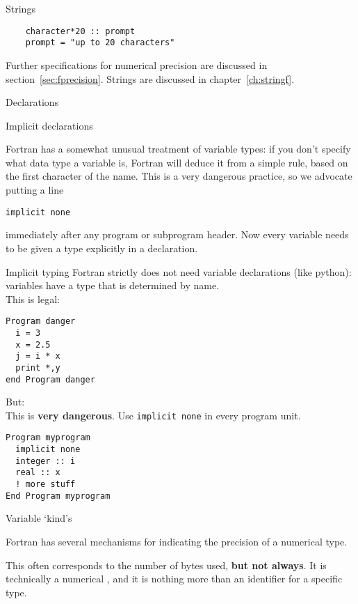 \begin{slide}{Strings}
  \label{sl:fchar20}
  \begin{lstlisting}
    character*20 :: prompt
    prompt = "up to 20 characters"
  \end{lstlisting}
\end{slide}

Further specifications for numerical
precision are discussed in section~\ref{sec:fprecision}.
Strings are discussed in chapter~\ref{ch:stringf}.

 {Declarations}
\label{sec:ftype}

 {Implicit declarations}
\label{sec:f-implicit}

Fortran has a somewhat unusual treatment of variable types:
if you don't
specify what data type a variable is, Fortran will deduce it from
a simple rule, based on the first character of the name.
This is a very dangerous practice, so we
advocate putting a line
\begin{lstlisting}
implicit none
\end{lstlisting}
immediately after any program or subprogram header.
Now every variable needs to be given a type explicitly
in a declaration.

\begin{slide}{Implicit typing}
  \label{sl:fimplicit}
  Fortran strictly does not need variable declarations (like python):\\
  variables have a type that is determined by name.\\
  This is legal:
\begin{lstlisting}
Program danger
  i = 3
  x = 2.5
  j = i * x
  print *,y
end Program danger
\end{lstlisting}
 But:\\
  This is \textbf{very dangerous}. Use \lstinline{implicit none}
  in every program unit.
\begin{lstlisting}
Program myprogram
  implicit none
  integer :: i
  real :: x
  ! more stuff
End Program myprogram
\end{lstlisting}
\end{slide}

 {Variable `kind's}
\label{sec:fprecision}

Fortran has several mechanisms for indicating the precision of a numerical type.
%

This often corresponds to the number of bytes used, \textbf{but not always}.
It is technically a numerical ,
and it is nothing more than an identifier for a specific type.

